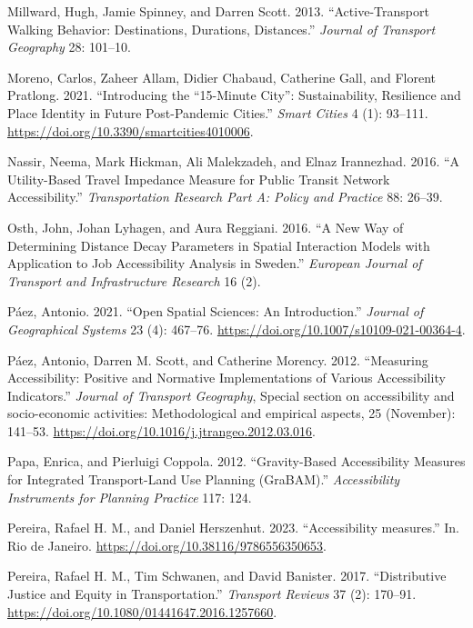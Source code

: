 \documentclass[preprint, 3p,
authoryear]{elsarticle} %
\newlength{\cslhangindent}
\newenvironment{CSLReferences}[2] %
 {\begin{list}{}{%
  \setlength{\itemindent}{0pt}
  \setlength{\leftmargin}{0pt}
  \setlength{\parsep}{0pt}
  \ifodd #1
   \setlength{\leftmargin}{\cslhangindent}
   \setlength{\itemindent}{-1\cslhangindent}
  \fi
  \setlength{\itemsep}{#2\baselineskip}}}
 {\end{list}}
\begin{document}
\begin{CSLReferences}{1}{0}
Millward, Hugh, Jamie Spinney, and Darren Scott. 2013.
{``Active-Transport Walking Behavior: Destinations, Durations,
Distances.''} \emph{Journal of Transport Geography} 28: 101--10.

Moreno, Carlos, Zaheer Allam, Didier Chabaud, Catherine Gall, and
Florent Pratlong. 2021. {``Introducing the {``}15-Minute City{''}:
Sustainability, Resilience and Place Identity in Future Post-Pandemic
Cities.''} \emph{Smart Cities} 4 (1): 93--111.
\url{https://doi.org/10.3390/smartcities4010006}.

Nassir, Neema, Mark Hickman, Ali Malekzadeh, and Elnaz Irannezhad. 2016.
{``A Utility-Based Travel Impedance Measure for Public Transit Network
Accessibility.''} \emph{Transportation Research Part A: Policy and
Practice} 88: 26--39.

Osth, John, Johan Lyhagen, and Aura Reggiani. 2016. {``A New Way of
Determining Distance Decay Parameters in Spatial Interaction Models with
Application to Job Accessibility Analysis in Sweden.''} \emph{European
Journal of Transport and Infrastructure Research} 16 (2).

Páez, Antonio. 2021. {``Open Spatial Sciences: An Introduction.''}
\emph{Journal of Geographical Systems} 23 (4): 467--76.
\url{https://doi.org/10.1007/s10109-021-00364-4}.

Páez, Antonio, Darren M. Scott, and Catherine Morency. 2012.
{``Measuring Accessibility: Positive and Normative Implementations of
Various Accessibility Indicators.''} \emph{Journal of Transport
Geography}, Special section on accessibility and socio-economic
activities: Methodological and empirical aspects, 25 (November):
141--53. \url{https://doi.org/10.1016/j.jtrangeo.2012.03.016}.

Papa, Enrica, and Pierluigi Coppola. 2012. {``Gravity-Based
Accessibility Measures for Integrated Transport-Land Use Planning
(GraBAM).''} \emph{Accessibility Instruments for Planning Practice} 117:
124.

Pereira, Rafael H. M., and Daniel Herszenhut. 2023. {``Accessibility
measures.''} In. Rio de Janeiro.
\url{https://doi.org/10.38116/9786556350653}.

Pereira, Rafael H. M., Tim Schwanen, and David Banister. 2017.
{``Distributive Justice and Equity in Transportation.''} \emph{Transport
Reviews} 37 (2): 170--91.
\url{https://doi.org/10.1080/01441647.2016.1257660}.


\end{CSLReferences}
\end{document}

